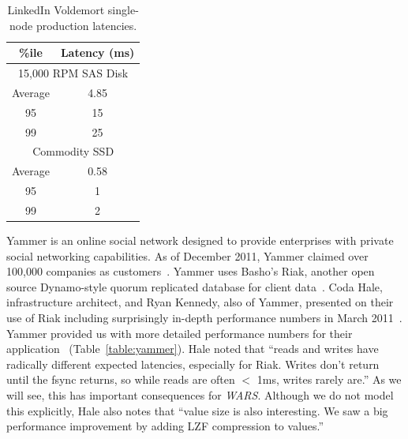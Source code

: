 \documentclass{vldb}
\begin{document}
\begin{table}
\centering
\begin{tabular}{|c|c|}
\hline
\%ile & Latency (ms) \\
\hline
\multicolumn{2}{|c|}{ 15,000 RPM SAS Disk}\\
\hline
Average & 4.85\\
95 & 15\\
99 & 25\\
\hline
\multicolumn{2}{|c|}{ Commodity SSD }\\
\hline
Average & 0.58 \\
95 & 1\\
99 & 2\\
\hline
\end{tabular}
\vspace{-6pt}
\caption{LinkedIn Voldemort single-node production latencies.}
\vspace{-12pt}
\label{table:linkedin}
\end{table}

Yammer is an online social network designed to provide enterprises
with private social networking capabilities.  As of December 2011,
Yammer claimed over 100,000 companies as customers~\cite{yammer}.
Yammer uses Basho's Riak, another open source Dynamo-style quorum
replicated database for client data~\cite{riak}.  Coda Hale,
infrastructure architect, and Ryan Kennedy, also of Yammer, presented
on their use of Riak including surprisingly in-depth performance
numbers in March 2011~\cite{riakyammer}.  Yammer provided us with more
detailed performance numbers for their application~\cite{codapc}
(Table~\ref{table:yammer}).  Hale noted that ``reads and writes have
radically different expected latencies, especially for Riak. Writes
don't return until the fsync returns, so while reads are often $<$
1ms, writes rarely are.''  As we will see, this has important
consequences for \textit{WARS}.  Although we do not model this
explicitly, Hale also notes that ``value size is also interesting. We
saw a big performance improvement by adding LZF compression to
values.''
\end{document}
